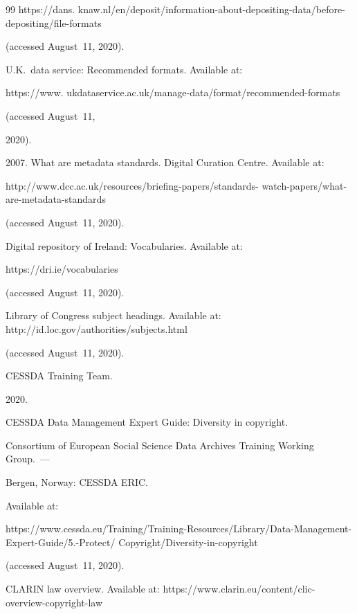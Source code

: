 {{\begin{thebibliography}{99}
{https://dans. knaw.nl/en/deposit/information-about-depositing-data/before-depositing/file-formats} 

(accessed August~11, 2020).


U.K.\ data service: Recommended formats. Available at: {\sf  

https://www. ukdataservice.ac.uk/manage-data/format/recommended-formats} (accessed August~11, 

2020).

 


 2007. What are metadata standards. Digital Curation Centre. Available at: {\sf 

http://www.dcc.ac.uk/resources/briefing-papers/standards- watch-papers/what-are-metadata-standards} 

(accessed August~11, 2020).


Digital repository of Ireland: Vocabularies. Available at: {\sf 

https://dri.ie/vocabularies} (accessed August~11, 2020).


Library of Congress subject headings. Available at: {\sf http://id.loc.gov/authorities/\linebreak subjects.html} 

(accessed August~11, 2020).


CESSDA Training Team. 

2020.

 CESSDA Data Management Expert Guide: Diversity in copyright.

 Consortium of European Social Science Data Archives Training Working Group.~--- 

Bergen, Norway: \mbox{CESSDA} ERIC.

 Available at: {\sf 

https://www.cessda.eu/\linebreak Training/Training-Resources/Library/Data-Management-Expert-Guide/5.-Protect/ Copyright/Diversity-in-copyright} 

(accessed August~11, 2020).


CLARIN law overview. Available at: {\sf https://www.clarin.eu/content/clic-overview-copyright-law} 


\end{thebibliography}}}
